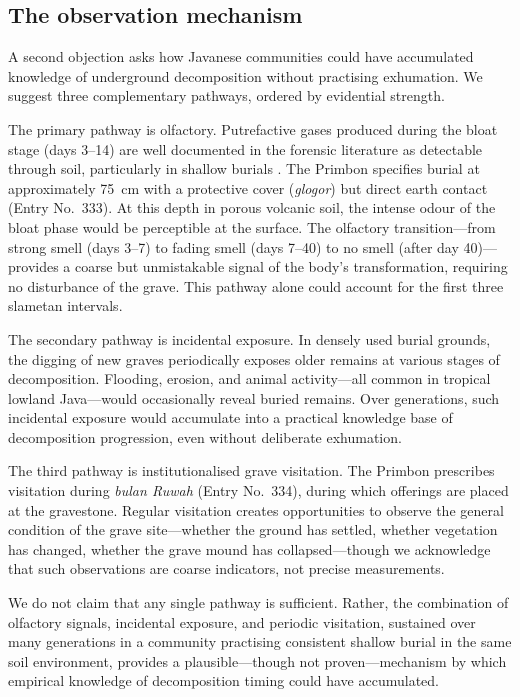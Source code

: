 \documentclass[12pt,a4paper]{article}
\begin{document}
\subsection{The observation mechanism}

A second objection asks how Javanese communities could have accumulated knowledge of underground decomposition without practising exhumation. We suggest three complementary pathways, ordered by evidential strength.

The primary pathway is olfactory. Putrefactive gases produced during the bloat stage (days 3--14) are well documented in the forensic literature as detectable through soil, particularly in shallow burials \citep{vass_2001, carter_tibbett_2008}. The Primbon specifies burial at approximately 75~cm with a protective cover (\textit{glogor}) but direct earth contact (Entry No.~333). At this depth in porous volcanic soil, the intense odour of the bloat phase would be perceptible at the surface. The olfactory transition---from strong smell (days 3--7) to fading smell (days 7--40) to no smell (after day 40)---provides a coarse but unmistakable signal of the body's transformation, requiring no disturbance of the grave. This pathway alone could account for the first three slametan intervals.

The secondary pathway is incidental exposure. In densely used burial grounds, the digging of new graves periodically exposes older remains at various stages of decomposition. Flooding, erosion, and animal activity---all common in tropical lowland Java---would occasionally reveal buried remains. Over generations, such incidental exposure would accumulate into a practical knowledge base of decomposition progression, even without deliberate exhumation.

The third pathway is institutionalised grave visitation. The Primbon prescribes visitation during \textit{bulan Ruwah} (Entry No.~334), during which offerings are placed at the gravestone. Regular visitation creates opportunities to observe the general condition of the grave site---whether the ground has settled, whether vegetation has changed, whether the grave mound has collapsed---though we acknowledge that such observations are coarse indicators, not precise measurements.

We do not claim that any single pathway is sufficient. Rather, the combination of olfactory signals, incidental exposure, and periodic visitation, sustained over many generations in a community practising consistent shallow burial in the same soil environment, provides a plausible---though not proven---mechanism by which empirical knowledge of decomposition timing could have accumulated.
\end{document}
